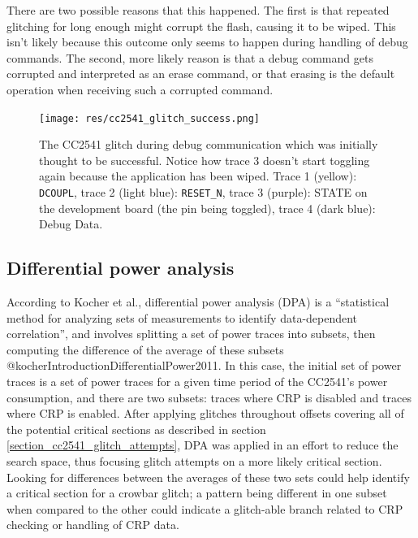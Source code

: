 There are two possible reasons that this happened. The first is that
repeated glitching for long enough might corrupt the flash, causing it
to be wiped. This isn't likely because this outcome only seems to happen
during handling of debug commands. The second, more likely reason is
that a debug command gets corrupted and interpreted as an erase command,
or that erasing is the default operation when receiving such a corrupted
command.

\begin{figure}
\centering
\texttt{[image: res/cc2541\_glitch\_success.png]}
\caption{The CC2541 glitch during debug communication which was
initially thought to be successful. Notice how trace 3 doesn't start
toggling again because the application has been wiped. Trace 1 (yellow):
\texttt{DCOUPL}, trace 2 (light blue): \texttt{RESET\_N}, trace 3
(purple): STATE on the development board (the pin being toggled), trace
4 (dark blue): Debug Data. \label{img_cc2541_glitch_success}}
\end{figure}

\newpage

\hypertarget{differential-power-analysis}{%
\subsection{\texorpdfstring{Differential power
analysis\label{section_cc2541_dpa}}{Differential power analysis}}\label{differential-power-analysis}}

According to Kocher et al., differential power analysis (DPA) is a
``statistical method for analyzing sets of measurements to identify
data-dependent correlation'', and involves splitting a set of power
traces into subsets, then computing the difference of the average of
these subsets @kocherIntroductionDifferentialPower2011. In this case,
the initial set of power traces is a set of power traces for a given
time period of the CC2541's power consumption, and there are two
subsets: traces where CRP is disabled and traces where CRP is enabled.
After applying glitches throughout offsets covering all of the potential
critical sections as described in section
\ref{section_cc2541_glitch_attempts}, DPA was applied in an effort to
reduce the search space, thus focusing glitch attempts on a more likely
critical section. Looking for differences between the averages of these
two sets could help identify a critical section for a crowbar glitch; a
pattern being different in one subset when compared to the other could
indicate a glitch-able branch related to CRP checking or handling of CRP
data.

